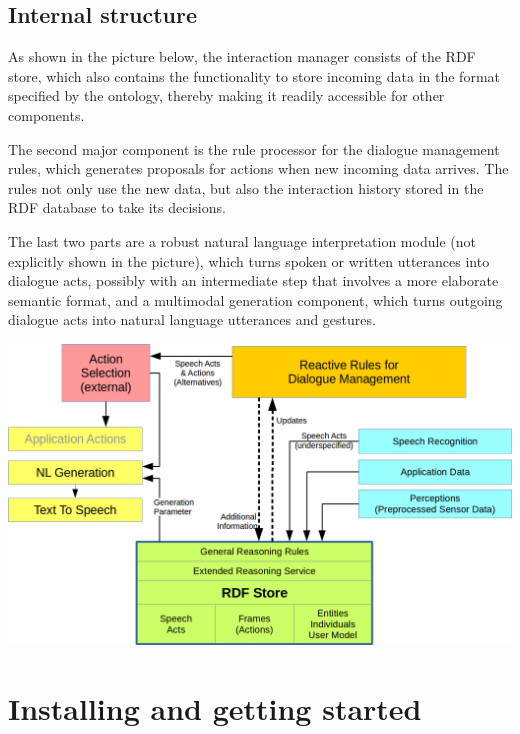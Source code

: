 \documentclass[a4paper]{memoir}
\begin{document}
\section{Internal structure}

As shown in the picture below, the interaction manager consists of the RDF
store, which also contains the functionality to store incoming data in the
format specified by the ontology, thereby making it readily accessible for
other components.

The second major component is the rule processor for the dialogue management
rules, which generates proposals for actions when new incoming data
arrives. The rules not only use the new data, but also the interaction history
stored in the RDF database to take its decisions.

The last two parts are a robust natural language interpretation module (not
explicitly shown in the picture), which turns spoken or written utterances
into dialogue acts, possibly with an intermediate step that involves a more
elaborate semantic format, and a multimodal generation component, which turns
outgoing dialogue acts into natural language utterances and gestures.

\vspace*{4ex}

\includegraphics[width=.9\textwidth]{rudimant.png}



\chapter{Installing and getting started}







\end{document}
